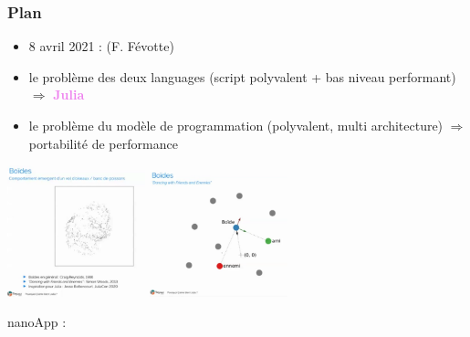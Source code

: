 \begin{frame}
  \frametitle{Plan}

  \begin{itemize}
  \item 8 avril 2021 :  (F. Févotte)
  \item le problème des deux languages (script polyvalent + bas niveau performant) $\Rightarrow$ \textcolor{violet}{\bf Julia}
  \item le problème du modèle de programmation (polyvalent, multi architecture) $\Rightarrow$ portabilité de performance
  \end{itemize}

  \begin{center}
    \includegraphics[width=4cm]{julia/pourquoi_julia1}
    \includegraphics[width=4cm]{julia/pourquoi_julia2}
  \end{center}
  nanoApp : 

\end{frame}
